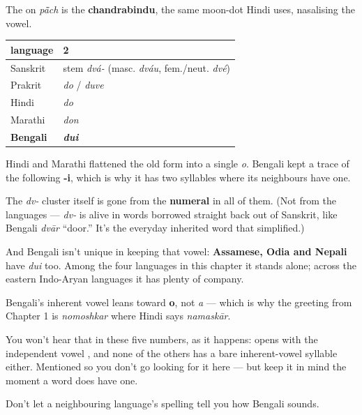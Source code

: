 The \textbf{} on \emph{pā̃ch} is the \textbf{chandrabindu}, the same moon-dot Hindi uses, nasalising the vowel.

\begin{cousinweb}
\noindent
\begin{tabularx}{\linewidth}{@{}>{\raggedright\arraybackslash}X>{\raggedright\arraybackslash}X@{}}
\toprule
\textbf{language} & \textbf{2} \\
\midrule
Sanskrit & stem \emph{dvá-} (masc. \emph{dváu}, fem./neut. \emph{dvé}) \\
Prakrit & \emph{do} / \emph{duve} \\
Hindi & \emph{do} \\
Marathi & \emph{don} \\
\textbf{Bengali} & \emph{\textbf{dui}} \\
\bottomrule
\end{tabularx}

Hindi and Marathi flattened the old form into a single \emph{o}. Bengali kept a trace of the following \textbf{-i}, which is why it has two syllables where its neighbours have one.

The \emph{dv-} cluster itself is gone from the \textbf{numeral} in all of them. (Not from the languages — \emph{dv-} is alive in words borrowed straight back out of Sanskrit, like Bengali \textbf{} \emph{dvār} \textquotedblleft{}door.\textquotedblright{} It's the everyday inherited word that simplified.)

And Bengali isn't unique in keeping that vowel: \textbf{Assamese, Odia and Nepali} have \emph{dui} too. Among the four languages in this chapter it stands alone; across the eastern Indo-Aryan languages it has plenty of company.
\end{cousinweb}

\begin{sounds}
Bengali's inherent vowel leans toward \textbf{o}, not \emph{a} — which is why the greeting from Chapter 1 is \emph{nomoshkar} where Hindi says \emph{namaskār}.

You won't hear that in these five numbers, as it happens: \textbf{} opens with the independent vowel , and none of the others has a bare inherent-vowel syllable either. Mentioned so you don't go looking for it here — but keep it in mind the moment a word does have one.

Don't let a neighbouring language's spelling tell you how Bengali sounds.
\end{sounds}

